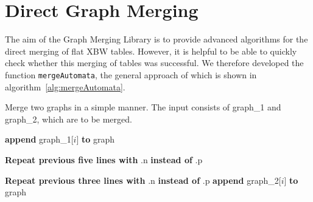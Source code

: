 \documentclass[a4paper,12pt,twoside,BCOR=10mm]{scrbook}
\begin{document}
\section{Direct Graph Merging}
\label{sec:direct_graph_merging}

The aim of the Graph Merging Library is to provide advanced algorithms 
for the direct merging of flat XBW tables. 
However, it is helpful to be able to quickly check whether this merging of tables 
was successful. 
We therefore developed the function \texttt{mergeAutomata}, 
the general approach of which is shown in algorithm~\ref{alg:mergeAutomata}. 
\begin{algorithm}
\caption[Merge two graphs]{Merge two graphs in a simple manner. The input consists of graph\_1 and graph\_2, which are to be merged.}
\label{alg:mergeAutomata}
\begin{algorithmic}[1]


\State \phantom{nl}

	\Else
		\State \textbf{append} graph\_1[$ i $] \textbf{to} graph
	\EndIf
\EndFor

\State \phantom{nl}

\EndFor

\State \phantom{nl}

		\EndIf
	\EndFor
	\State \textbf{Repeat previous five lines with} .n \textbf{instead of} .p
\EndFor

\State \phantom{nl}

	\EndFor
	\State \textbf{Repeat previous three lines with} .n \textbf{instead of} .p
	\State \textbf{append} graph\_2[$ i $] \textbf{to} graph
\EndFor


\end{algorithmic}
\end{algorithm}
\end{document}
